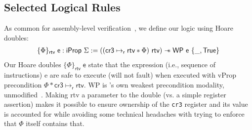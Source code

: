 \subsection{Selected Logical Rules}
\label{sec:selected_rules}
As common for assembly-level verification~, we define our logic using Hoare doubles:%
  \[
  \begin{array}{l}
    \{ \Phi \}_\mathsf{ rtv }\;\textsf{e} : \textsf{iProp }\Sigma := 
   ((\textsf{cr3} \mapsto_{\textsf{r}} \textsf{rtv} \ast \Phi) \textsf{ rtv}) \mathrel{-\!\!\ast} \textsf{WP e } \{\_, \textsf{True} \}
    \end{array}
  \]
Our Hoare doubles $\{\Phi\}_\textsf{rtv}\;\textsf{e}$ state that the expression (i.e., sequence of instructions)
\textsf{e} are safe to execute (will not fault)
when executed with \textsf{vProp} precondition $\Phi\ast\textsf{cr3}\mapsto_{\textsf{r}} \textsf{rtv}$.
\textsf{WP} is \iris's own weakest precondition modality, unmodified~\cite{jung2018iris}.
Making \textsf{rtv} a parameter to the double (vs. a simple register assertion)
makes it possible to ensure ownership of the \lstinline|cr3| register and its value is accounted for
while avoiding some technical headaches with trying to enforce that $\Phi$ itself contains that.


